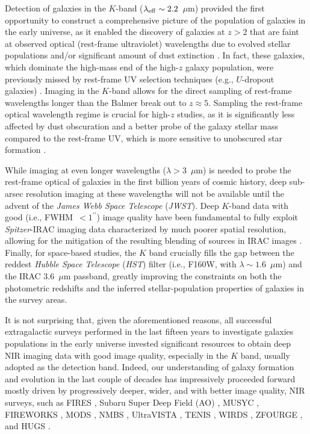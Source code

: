 \documentclass[preprint2]{aastex6}
\gdef\arcsec{^{\prime\prime}}
\begin{document}
Detection of galaxies in the $K$-band ($\lambda_{\rm eff} \sim 2.2$~$\mu$m) provided the first opportunity to construct a comprehensive picture of the population of galaxies in the early universe, as it enabled the discovery of galaxies at $z > 2$ that are faint at observed optical (rest-frame ultraviolet) wavelengths due to evolved stellar populations and/or significant amount of dust extinction \citep[e.g.,][]{franx:03, labbe:03, forster:04, minowa:05, kajisawa:06, brammer:07, taylor:09a}. In fact, these galaxies, which dominate the high-mass end of the high-$z$ galaxy population, were previously missed by rest-frame UV selection techniques (e.g., $U$-dropout galaxies) \citep[e.g.,][]{vandokkum:06}. Imaging in the $K$-band allows for the direct sampling of rest-frame wavelengths longer than the Balmer break out to $z\approx5$. Sampling the rest-frame optical wavelength regime is crucial for high-$z$ studies, as it is significantly less affected by dust obscuration and a better probe of the galaxy stellar mass compared to the rest-frame UV, which is more sensitive to unobscured star formation \citep[e.g., ][]{fontana:06, marchesini:09}. 

While imaging at even longer wavelengths ($\lambda>3$~$\mu$m) is needed to probe the rest-frame optical of galaxies in the first billion years of cosmic history, deep sub-arsec resolution imaging at these wavelengths will not be available until the advent of the {\it James Webb Space Telescope} ({\it JWST}). Deep $K$-band data with good  (i.e., FWHM~$<1\arcsec$) image quality have been fundamental to fully exploit {\it Spitzer}-IRAC imaging data characterized by much poorer spatial resolution, allowing for the mitigation of the resulting blending of sources in IRAC images \citep[e.g.,][]{labbe:05}. Finally, for space-based studies, the $K$ band crucially fills the gap between the reddest {\it Hubble Space Telescope} ({\it HST}) filter (i.e., F160W, with $\lambda \sim 1.6$~$\mu$m) and the IRAC 3.6~$\mu$m passband, greatly improving the constraints on both the photometric redshifts and the inferred stellar-population properties of galaxies in the survey areas. 

It is not surprising that, given the aforementioned reasons, all successful extragalactic surveys performed in the last fifteen years to investigate galaxies populations in the early universe invested significant resources to obtain deep NIR imaging data with good image quality, especially in the $K$ band, usually adopted as the detection band. Indeed, our understanding of galaxy formation and evolution in the last couple of decades has impressively proceeded forward mostly driven by progressively deeper, wider, and with better image quality, NIR surveys, such as FIRES \citep{labbe:03}, Subaru Super Deep Field (AO) \citep{minowa:05}, MUSYC \citep{quadri:07, taylor:09b}, FIREWORKS \citep{wuyts:fireworks}, MODS \citep{kajisawa:11}, NMBS \citep{whitaker:nmbs}, UltraVISTA \citep{mccracken:ultravista}, TENIS \citep{hsieh:tenis}, WIRDS \citep{bielby:12}, ZFOURGE \citep{spitler:12}, and HUGS \citep{hugs}.
\end{document}
